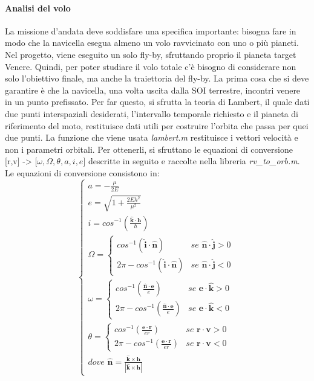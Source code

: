 \documentclass[a4paper]{article}
\begin{document}
\paragraph{Analisi del volo\newline}
La missione d'andata deve soddisfare una specifica importante: bisogna fare in modo che la navicella esegua almeno un volo ravvicinato con uno o più pianeti. Nel progetto, viene eseguito un solo fly-by, sfruttando proprio il pianeta target Venere. Quindi, per poter studiare il volo totale c'è bisogno di considerare non solo l'obiettivo finale, ma anche la traiettoria del fly-by. \newline La prima cosa che si deve garantire è che la navicella, una volta uscita dalla SOI terrestre, incontri venere in un punto prefissato. Per far questo, si sfrutta la teoria di Lambert, il quale dati due punti interspaziali desiderati, l'intervallo temporale richiesto e il pianeta di riferimento del moto, restituisce dati utili per costruire l'orbita che passa per quei due punti. \newline La funzione che viene usata \textit{lambert.m} restituisce i vettori velocità e non i parametri orbitali. Per ottenerli, si sfruttano le equazioni di conversione [r,v] -> [$\omega, \Omega, \theta, a, i, e$] descritte in seguito e raccolte nella libreria \textit{rv\_to\_orb.m}. \newline Le equazioni di conversione consistono in:
\[
\begin{cases}
a = -\frac{\mu}{2E} \\
e = \sqrt{1+\frac{2Eh^{2}}{\mu^{2}}} \\
i = cos^{-1}(\frac{\mathbf{\hat{k} \cdot h}}{h}) \\
\Omega = \begin{cases}
cos^{-1}(\mathbf{\hat{i} \cdot \hat{n}}) & \textit{se $\mathbf{\hat{n}\cdot \hat{j}} > 0$}\\
2\pi - cos^{-1}(\mathbf{\hat{i} \cdot \hat{n}})  & \textit{se $\mathbf{\hat{n}\cdot \hat{j}} < 0$} \end{cases} \\
\omega = \begin{cases}
cos^{-1}(\frac{\mathbf{\hat{n} \cdot e}}{e}) & \textit{se $\mathbf{e \cdot \hat{k}} >0$} \\
2\pi - cos^{-1}(\frac{\mathbf{\hat{n} \cdot e}}{e}) & \textit{se $\mathbf{e \cdot \hat{k}} <0$} \end{cases} \\
\theta = \begin{cases}
cos^{-1}(\frac{\mathbf{{e} \cdot r}}{er}) & \textit{se $\mathbf{r \cdot v} >0$} \\
2\pi - cos^{-1}(\frac{\mathbf{{e} \cdot r}}{er}) & \textit{se $\mathbf{r \cdot v} <0$} \end{cases} \\
\textit{dove $\mathbf{\hat{n} = \frac{\hat{k} \times h}{|\hat{k} \times h|}}$} 
\end{cases}
\]
\end{document}
